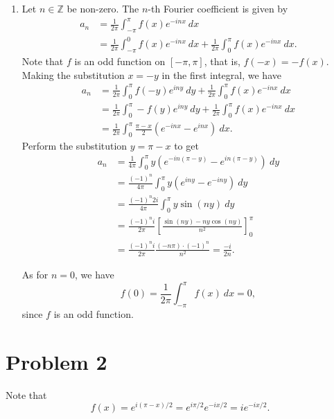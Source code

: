 \documentclass[12pt]{amsart}
\newcommand{\Z}{\mathbb{Z}}
\begin{document}
\begin{enumerate}[label=(\alph*)]
    \item Let $n\in\Z$ be non-zero. The $n$-th Fourier coefficient is given by 
    \begin{align*}
        a_n &= \frac{1}{2\pi}\int_{-\pi}^\pi f(x)e^{-inx}~dx\\
        &= \frac{1}{2\pi}\int_{-\pi}^0 f(x)e^{-inx}~dx + \frac{1}{2\pi}\int_{0}^\pi f(x)e^{-inx}~dx.
    \end{align*}
    Note that $f$ is an odd function on $[-\pi, \pi]$, that is, $f(-x) = -f(x)$. Making the substitution $x = -y$ in the first integral, we have 
    \begin{align*}
        a_n &= \frac{1}{2\pi}\int_{0}^\pi f(-y)e^{iny}~dy + \frac{1}{2\pi}\int_{0}^\pi f(x)e^{-inx}~dx\\
        &= \frac{1}{2\pi}\int_{0}^{\pi}-f(y)e^{iny}~dy + \frac{1}{2\pi}\int_{0}^{\pi} f(x)e^{-inx}~dx\\
        &= \frac{1}{2\pi}\int_{0}^\pi \frac{\pi - x}{2}\left(e^{-inx} - e^{inx}\right)~dx.
    \end{align*}
    Perform the substitution $y = \pi - x$ to get 
    \begin{align*}
        a_n &= \frac{1}{4\pi}\int_{0}^\pi y\left(e^{-in(\pi - y)} - e^{in(\pi - y)}\right)~dy\\
        &= \frac{(-1)^n}{4\pi}\int_0^\pi y(e^{iny} - e^{-iny})~dy\\
        &= \frac{(-1)^n 2i}{4\pi}\int_{0}^\pi y\sin(ny)~dy\\
        &= \frac{(-1)^ni}{2\pi}\left[\frac{\sin(ny) - ny\cos(ny)}{n^2}\right]_0^\pi\\
        &= \frac{(-1)^ni}{2\pi}\frac{(-n\pi)\cdot(-1)^n}{n^2} = \frac{-i}{2n}.
    \end{align*}

    As for $n = 0$, we have 
    \begin{equation*}
        f(0) = \frac{1}{2\pi}\int_{-\pi}^{\pi} f(x)~dx = 0,
    \end{equation*}
    since $f$ is an odd function.
\end{enumerate}

\section*{Problem 2}

Note that 
\begin{equation*}
    f(x) = e^{i(\pi - x)/2} = e^{i\pi/2}e^{-ix/2} = ie^{-ix/2}.
\end{equation*}
\end{document}
